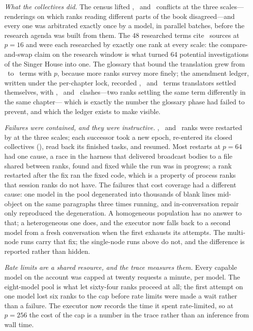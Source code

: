 \emph{What the collectives did.}  The census lifted \eSevenConflictsSixteen,
\eSevenConflictsThirtytwo\ and \eSevenConflictsSixtyfour\ conflicts at the
three scales---renderings on which ranks reading different parts of the book
disagreed---and every one was arbitrated exactly once by a model, in parallel
batches, before the research agenda was built from them.  The 48 researched
terms cite \eSevenSourcesSixteen\ sources at $p=16$ and were each researched
by exactly one rank at every scale: the compare-and-swap claim on the research
window is what turned 64 potential investigations of the Singer House into one.
The glossary that bound the translation grew from \eSevenGlossarySixteen\ to
\eSevenGlossarySixtyfour\ terms with $p$, because more ranks survey more
finely; the amendment ledger, written under the per-chapter lock, recorded
\eSevenAmendmentsSixteen, \eSevenAmendmentsThirtytwo\ and
\eSevenAmendmentsSixtyfour\ terms translators settled themselves, with
\eSevenClashesSixteen, \eSevenClashesThirtytwo\ and \eSevenClashesSixtyfour\
clashes---two ranks settling the same term differently in the same chapter---
which is exactly the number the glossary phase had failed to prevent, and which
the ledger exists to make visible.

\emph{Failures were contained, and they were instructive.}  \eSevenRestartsSixteen,
\eSevenRestartsThirtytwo\ and \eSevenRestartsSixtyfour\ ranks were restarted by
\code{ampirun} at the three scales; each successor took a new epoch, re-entered
its closed collectives (\eSevenReplaysNote), read back its finished tasks, and
resumed.  Most restarts at $p=64$ had one cause, a race in the harness that
delivered broadcast bodies to a file shared between ranks, found and fixed
while the run was in progress; a rank restarted after the fix ran the fixed
code, which is a property of process ranks that session ranks do not have.
The failures that cost coverage had a different cause: one model in the pool
degenerated into thousands of blank lines mid-object on the same paragraphs
three times running, and in-conversation repair only reproduced the
degeneration.  A homogeneous population has no answer to that; a heterogeneous
one does, and the executor now falls back to a second model from a fresh
conversation when the first exhausts its attempts.  The multi-node runs carry
that fix; the single-node runs above do not, and the difference is reported
rather than hidden.

\emph{Rate limits are a shared resource, and the trace measures them.}  Every
capable model on the account was capped at twenty requests a minute, per
model.  The eight-model pool is what let sixty-four ranks proceed at all; the
first attempt on one model lost six ranks to the cap before rate limits were
made a wait rather than a failure.  The executor now records the time it spent
rate-limited, so at $p=256$ the cost of the cap is a number in the trace
rather than an inference from wall time.

